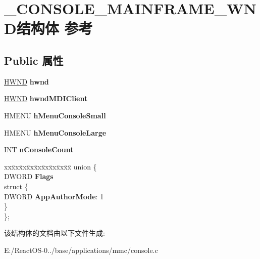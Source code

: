 \hypertarget{struct___c_o_n_s_o_l_e___m_a_i_n_f_r_a_m_e___w_n_d}{}\section{\+\_\+\+C\+O\+N\+S\+O\+L\+E\+\_\+\+M\+A\+I\+N\+F\+R\+A\+M\+E\+\_\+\+W\+N\+D结构体 参考}
\label{struct___c_o_n_s_o_l_e___m_a_i_n_f_r_a_m_e___w_n_d}
\subsection*{Public 属性}
\begin{DoxyCompactItemize}
\item 
\mbox{\label{struct___c_o_n_s_o_l_e___m_a_i_n_f_r_a_m_e___w_n_d_a136b2bbf3511d276764a7dcdc5ec47eb}} 
\hyperlink{interfacevoid}{H\+W\+ND} {\bfseries hwnd}
\item 
\mbox{\label{struct___c_o_n_s_o_l_e___m_a_i_n_f_r_a_m_e___w_n_d_aef03bcd5aad19464082650f691d0ca8e}} 
\hyperlink{interfacevoid}{H\+W\+ND} {\bfseries hwnd\+M\+D\+I\+Client}
\item 
\mbox{\label{struct___c_o_n_s_o_l_e___m_a_i_n_f_r_a_m_e___w_n_d_a18ba0d49f90a8bf2dd17d3be668f4b76}} 
H\+M\+E\+NU {\bfseries h\+Menu\+Console\+Small}
\item 
\mbox{\label{struct___c_o_n_s_o_l_e___m_a_i_n_f_r_a_m_e___w_n_d_a6f4b14b1372a5b53292a04b146745280}} 
H\+M\+E\+NU {\bfseries h\+Menu\+Console\+Large}
\item 
\mbox{\label{struct___c_o_n_s_o_l_e___m_a_i_n_f_r_a_m_e___w_n_d_a9ab4fc7ef5a56e64d78e626fd533fe42}} 
I\+NT {\bfseries n\+Console\+Count}
\item 
\mbox{\label{struct___c_o_n_s_o_l_e___m_a_i_n_f_r_a_m_e___w_n_d_a79c6e9cf49229e27910450b7b3c7e98d}} 
\begin{tabbing}
xx\=xx\=xx\=xx\=xx\=xx\=xx\=xx\=xx\=\kill
union \{\\
\>DWORD {\bfseries Flags}\\
\mbox{\label{union___c_o_n_s_o_l_e___m_a_i_n_f_r_a_m_e___w_n_d_1_1_0D6_a0d10be510c6b24414539c0e965bbb90c}} 
\>struct \{\\
\>\>DWORD {\bfseries AppAuthorMode}: 1\\
\>\} \\
\}; \\

\end{tabbing}\end{DoxyCompactItemize}


该结构体的文档由以下文件生成\+:\begin{DoxyCompactItemize}
\item 
E\+:/\+React\+O\+S-\/0../base/applications/mmc/console.\+c\end{DoxyCompactItemize}
